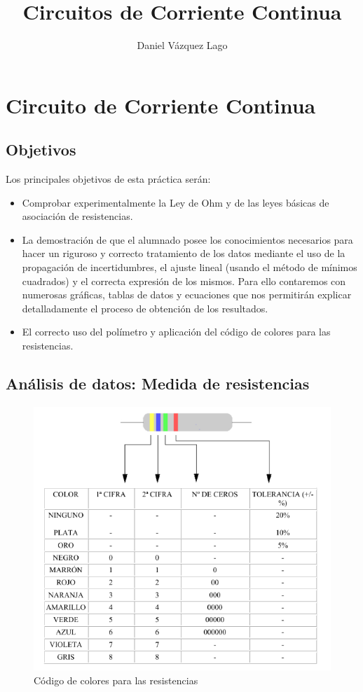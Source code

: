 \documentclass[10pt,a4paper]{article}
\author{Daniel Vázquez Lago}
\title{Circuitos de Corriente Continua}
\begin{document}
\maketitle
\newpage
\tableofcontents
\newpage
\section{Circuito de Corriente Continua}


\subsection{Objetivos} 
Los principales objetivos de esta práctica serán: \begin{itemize}
\item Comprobar experimentalmente la Ley de Ohm y de las leyes básicas de asociación de resistencias.
\item La demostración de que el alumnado posee los conocimientos necesarios para hacer un riguroso y correcto tratamiento de los datos mediante el uso de la propagación de incertidumbres, el ajuste lineal (usando el método de mínimos cuadrados) y el correcta expresión de los mismos. Para ello contaremos con numerosas gráficas, tablas de datos y ecuaciones que nos permitirán explicar detalladamente el proceso de obtención de los resultados. 
\item El correcto uso del polímetro y aplicación del código de colores para las resistencias.
\end{itemize}
\subsection{Análisis de datos:  Medida de resistencias}

\begin{figure}[htb] %
\centering
\includegraphics[width=12cm, height=10cm]{Resistencias}
\caption{Código de colores para las resistencias}
\label{fig: Resistencias}
\end{figure}
\end{document}
